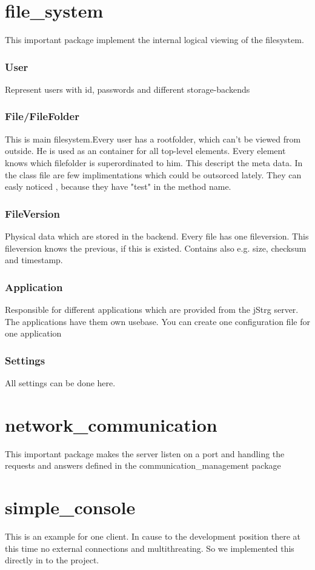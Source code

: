 \documentclass
[   oneside,         %
    12pt,            %
    DIV15,           %
    headsepline,     %
    footsepline,     %
    openright,       %
    a4paper,         %
    abstracton,      %
    titlepage,       %
    headinclude,     %
]   {scrreprt}       %
\begin{document}
	\section{file\_system}
	This important package implement the internal logical viewing of the filesystem.
	\subsubsection{User} 
	Represent users with id, passwords and different storage-backends
	\subsubsection{File/FileFolder}
	This is main filesystem.Every user has a rootfolder, which can't be viewed from outside. He is used as an container for all top-level elements. Every element knows which filefolder is superordinated to him. This descript the meta data. In the class file are few implimentations which could be outsorced lately. They can easly noticed , because they have "test" in the method name.

	\subsubsection{FileVersion}
    Physical data which are stored in the backend. Every file has one fileversion. This fileversion knows the previous, if this is existed. Contains also e.g. size, checksum and timestamp. 
	\subsubsection{Application}
	Responsible for different applications which are provided from the jStrg server. The applications have them own usebase. You can create one configuration file for one application
	\subsubsection{Settings}
	All settings can be done here.
	
	\section{network\_communication}
	This important package makes the server listen on a port and handling the requests and answers defined in the communication\_management package
	
	\section{simple\_console}
	This is an example for one client. In cause to the development position there at this time no external connections and multithreating. So we implemented this directly in to the project.
\end{document}
